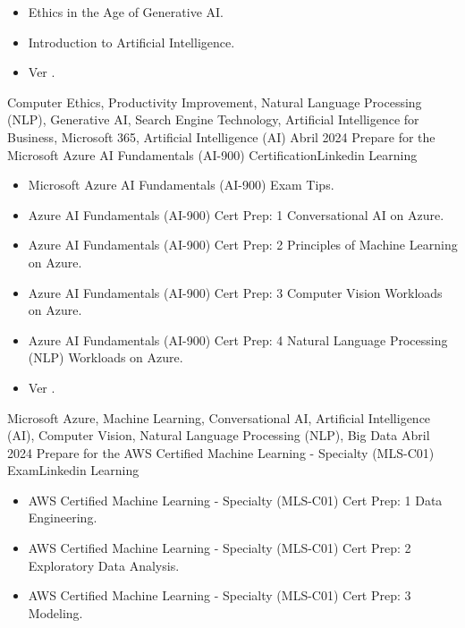 \begin{certs}
{\begin{itemize}
        \item Ethics in the Age of Generative AI.
        \item Introduction to Artificial Intelligence.
        \item Ver \href{https://www.linkedin.com/learning/certificates/a9341341fa8a79c18c53fdbf5266308236a238d77d7ad2b3cccda6cef2e2a67c}{\color{CadetBlue}{Certificado}}.
      \end{itemize}
    }
    {Computer Ethics, Productivity Improvement, Natural Language Processing (NLP), Generative AI, Search Engine Technology, Artificial Intelligence for Business, Microsoft 365, Artificial Intelligence (AI)} 
    \emptySeparator
    \cert
    {Abril 2024} {Prepare for the Microsoft Azure AI Fundamentals (AI-900) Certification}{Linkedin Learning}{}
    {}    {
      \begin{itemize}
        \item Microsoft Azure AI Fundamentals (AI-900) Exam Tips.
        \item Azure AI Fundamentals (AI-900) Cert Prep: 1 Conversational AI on Azure.
        \item Azure AI Fundamentals (AI-900) Cert Prep: 2 Principles of Machine Learning on Azure.
        \item Azure AI Fundamentals (AI-900) Cert Prep: 3 Computer Vision Workloads on Azure.
        \item Azure AI Fundamentals (AI-900) Cert Prep: 4 Natural Language Processing (NLP) Workloads on Azure.
        \item Ver \href{https://www.linkedin.com/learning/certificates/8724670360496820ace74307975a81ede24795b5f9f27d5c5000c1f155495735}{\color{CadetBlue}{Certificado}}.
      \end{itemize}
    }
    {Microsoft Azure, Machine Learning, Conversational AI, Artificial Intelligence (AI), Computer Vision, Natural Language Processing (NLP), Big Data}
    \emptySeparator
    \cert
    {Abril 2024} {Prepare for the AWS Certified Machine Learning - Specialty (MLS-C01) Exam}{Linkedin Learning}{}
    {}    {
      \begin{itemize}
        \item AWS Certified Machine Learning - Specialty (MLS-C01) Cert Prep: 1 Data Engineering.
        \item AWS Certified Machine Learning - Specialty (MLS-C01) Cert Prep: 2 Exploratory Data Analysis.
        \item AWS Certified Machine Learning - Specialty (MLS-C01) Cert Prep: 3 Modeling.

\end{itemize}}
\end{certs}

